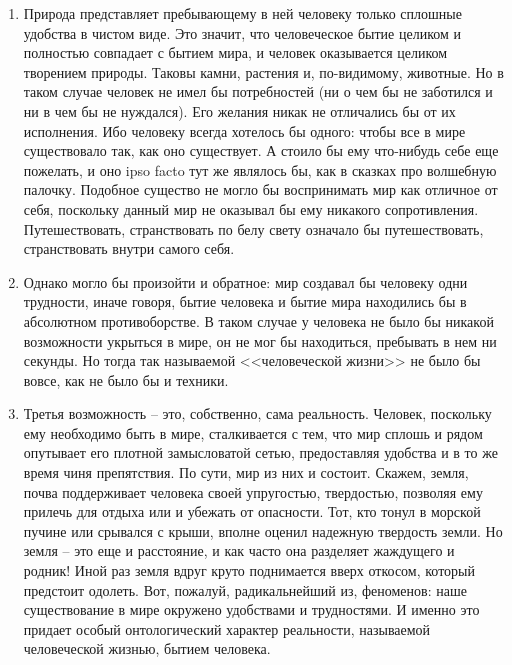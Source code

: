 \begin{enumerate}
    \item Природа представляет пребывающему в ней человеку только сплошные 
        удобства в чистом виде. Это значит, что человеческое бытие целиком и 
        полностью совпадает с бытием мира, и человек оказывается целиком 
        творением природы. Таковы камни, растения и, по-видимому, животные. Но 
        в таком случае человек не имел бы потребностей (ни о чем бы не 
        заботился и ни в чем бы не нуждался). Его желания никак не отличались 
        бы от их исполнения. Ибо человеку всегда хотелось бы одного: чтобы все 
        в мире существовало так, как оно существует. А стоило бы ему что-нибудь 
        себе еще пожелать, и оно ipso facto тут же являлось бы, как в сказках 
        про волшебную палочку. Подобное существо не могло бы воспринимать мир 
        как отличное от себя, поскольку данный мир не оказывал бы ему никакого 
        сопротивления. Путешествовать, странствовать по белу свету означало бы 
        путешествовать, странствовать внутри самого себя.

    \item Однако могло бы произойти и обратное: мир создавал бы человеку одни 
        трудности, иначе говоря, бытие человека и бытие мира находились бы в 
        абсолютном противоборстве. В таком случае у человека не было бы 
        никакой возможности укрыться в мире, он не мог бы находиться, 
        пребывать в нем ни секунды. Но тогда так называемой <<человеческой 
        жизни>> не было бы вовсе, как не было бы и техники.

    \item Третья возможность -- это, собственно, сама реальность. Человек, 
        поскольку ему необходимо быть в мире, сталкивается с тем, что мир 
        сплошь и рядом опутывает его   плотной замысловатой сетью, 
        предоставляя удобства и в то же время чиня препятствия. По сути, мир 
        из них и состоит. Скажем, земля, почва поддерживает человека своей 
        упругостью, твердостью, позволяя ему прилечь для отдыха или и убежать 
        от опасности. Тот, кто тонул в морской пучине или срывался с крыши, 
        вполне оценил надежную твердость земли. Но земля -- это еще и 
        расстояние, и как часто она разделяет жаждущего и родник! Иной раз 
        земля вдруг круто поднимается вверх откосом, который предстоит 
        одолеть. Вот, пожалуй, радикальнейший из, феноменов: наше 
        существование в мире окружено удобствами и трудностями. И именно это 
        придает особый онтологический характер реальности, называемой 
        человеческой жизнью, бытием человека.
\end{enumerate}

